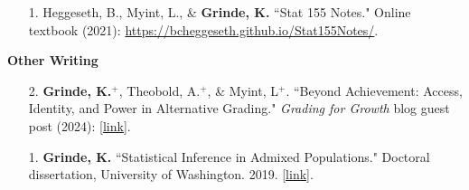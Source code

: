 \documentclass[margin]{res}
\begin{document}
\begin{resume}
\begin{itemize}
\item[1.] Heggeseth, B., Myint, L., \& \textbf{Grinde, K.} ``Stat 155 Notes." Online textbook (2021): \href{https://bcheggeseth.github.io/Stat155Notes/}{https://bcheggeseth.github.io/Stat155Notes/}. 

\end{itemize}


\textbf{Other Writing}
\begin{itemize}
\item[2.] \textbf{Grinde, K.}$^{+}$, Theobold,  A.$^{+}$, \& Myint,  L$^{+}$. ``Beyond Achievement: Access, Identity, and Power in Alternative Grading." \textit{Grading for Growth} blog guest post (2024): \href{https://gradingforgrowth.com/p/beyond-achievement?r=2ny4pq&utm_campaign=post&utm_medium=web}{[link]}.
	\begin{itemize} %
	\item[] 
	\end{itemize} %
\item[1.] \textbf{Grinde, K. }``Statistical Inference in Admixed Populations." Doctoral dissertation, University of Washington.  2019. \href{https://digital.lib.washington.edu/researchworks/handle/1773/44730?show=full}{[link]}.\\
\end{itemize}


\end{resume}
\end{document}
